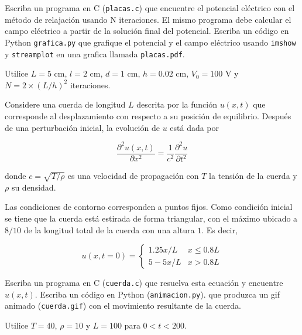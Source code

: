 \documentclass[11pt,letterpaper]{exam}
\begin{document}
\begin{questions}
Escriba un programa en C (\verb"placas.c") que encuentre el
potencial el\'ectrico con el m\'etodo de relajaci\'on usando N
iteraciones. El mismo programa debe calcular el campo el\'ectrico a
partir de la soluci\'on final del potencial.
Escriba un c\'odigo en Python \verb'grafica.py' que grafique el
potencial y el campo el\'ectrico usando \verb'imshow' y
\verb'streamplot' en una grafica llamada \verb'placas.pdf'.

Utilice $L = 5$ cm, $l = 2$ cm, $d = 1$ cm, $h = 0.02$ cm, $V_0 = 100$ V y $N = 2\times (L/h)^2$ iteraciones.
 


Considere una cuerda de longitud $L$ descrita por la funci\'on
$u(x,t)$ que corresponde al desplazamiento con respecto a su
posici\'on de equilibrio. Despu\'es de una perturbaci\'on inicial, la
evoluci\'on de $u$ est\'a dada por 

\begin{equation}
\frac{\partial^2 u (x,t)}{\partial x^2} =
\frac{1}{c^2}\frac{\partial^2 u}{\partial t^2}
\end{equation}

donde $c=\sqrt{T/\rho}$ es una velocidad de propagaci\'on con $T$ la
tensi\'on de la cuerda y $\rho$ su densidad.

Las condiciones de contorno corresponden a puntos fijos.  Como
condici\'on inicial se tiene que la cuerda est\'a estirada de forma
triangular, con el m\'aximo ubicado a $8/10$ de la longitud total de
la cuerda con una altura $1$. Es decir,

\begin{equation}
u(x,t=0) = 
\begin{cases}
1.25x/L & x \leq 0.8L\\
5-5x/L & x>0.8L
\end{cases}
\end{equation}

Escriba un programa en C (\verb'cuerda.c') que resuelva esta
ecuaci\'on y encuentre $u(x,t)$. Escriba un c\'odigo en Python (\verb'animacion.py').
que produzca un gif animado (\verb'cuerda.gif') con el movimiento
resultante de la cuerda. 

Utilice $T=40$, $\rho = 10$ y $L=100$ para $0<t<200$.



\end{questions}
\end{document}
